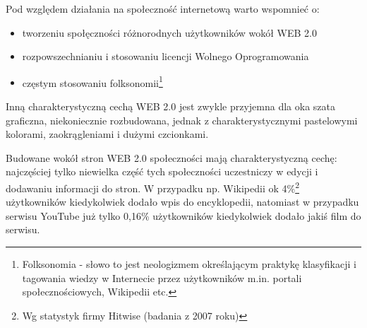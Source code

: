 \documentclass{article}
\begin{document}
		Pod względem działania na społeczność internetową warto wspomnieć o:
		\begin{itemize}
    		\item tworzeniu społęczności różnorodnych użytkowników wokół WEB 2.0
			\item rozpowszechnianiu i stosowaniu licencji Wolnego Oprogramowania
			\item częstym stosowaniu folksonomii\footnote{Folksonomia - słowo to jest neologizmem określającym praktykę klasyfikacji i tagowania wiedzy w Internecie przez użytkowników m.in. portali społecznościowych, Wikipedii etc.}
		\end{itemize}


		Inną charakterystyczną cechą WEB 2.0 jest zwykle przyjemna dla oka szata graficzna, niekoniecznie rozbudowana, jednak z charakterystycznymi pastelowymi kolorami, zaokrągleniami i dużymi czcionkami.

	
		Budowane wokół stron WEB 2.0 społeczności mają charakterystyczną cechę: najczęściej tylko niewielka część tych społeczności uczestniczy w edycji i dodawaniu informacji do stron. W przypadku np. Wikipedii ok 4\%\footnote{Wg statystyk firmy Hitwise (badania z 2007 roku)} użytkowników kiedykolwiek dodało wpis do encyklopedii, natomiast w przypadku serwisu YouTube już tylko 0,16\% użytkowników kiedykolwiek dodało jakiś film do serwisu. 		






\end{document}
